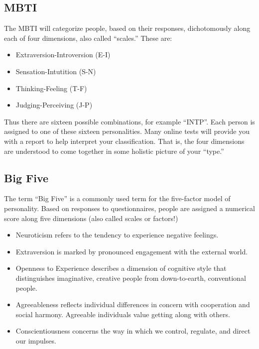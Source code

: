 \documentclass[]{book}
\providecommand{\tightlist}{%
  \setlength{\itemsep}{0pt}\setlength{\parskip}{0pt}}
\begin{document}
\hypertarget{mbti}{%
\subsection{MBTI}\label{mbti}}

The MBTI will categorize people, based on their responses, dichotomously along each of four dimensions, also called ``scales.'' These are:

\begin{itemize}
\tightlist
\item
  Extraversion-Introversion (E-I)
\item
  Sensation-Intutition (S-N)
\item
  Thinking-Feeling (T-F)
\item
  Judging-Perceiving (J-P)
\end{itemize}

Thus there are sixteen possible combinations, for example ``INTP''. Each person is assigned to one of these sixteen personalities. Many online tests will provide you with a report to help interpret your classification. That is, the four dimensions are understood to come together in some holistic picture of your ``type.''

\hypertarget{big-five}{%
\subsection{Big Five}\label{big-five}}

The term ``Big Five'' is a commonly used term for the five-factor model of personality. Based on responses to questionnaires, people are assigned a numerical score along five dimensions (also called scales or factors!)

\begin{itemize}
\tightlist
\item
  Neuroticism refers to the tendency to experience negative feelings.
\item
  Extraversion is marked by pronounced engagement with the external world.
\item
  Openness to Experience describes a dimension of cognitive style that distinguishes imaginative, creative people from down-to-earth, conventional people.
\item
  Agreeableness reflects individual differences in concern with cooperation and social harmony. Agreeable individuals value getting along with others.
\item
  Conscientiousness concerns the way in which we control, regulate, and direct our impulses.
\end{itemize}
\end{document}

